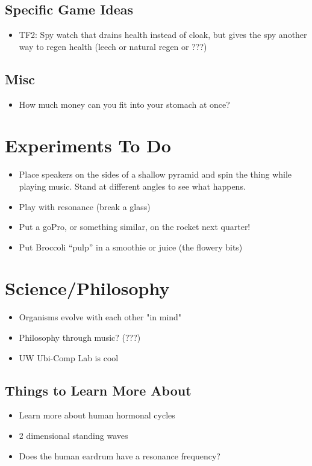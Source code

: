 \documentclass{amsart}
\begin{document}
\subsection{Specific Game Ideas}
\begin{itemize}
\item{TF2: Spy watch that drains health instead of cloak, but gives the spy another way to regen health (leech or natural regen or ???)}
\end{itemize}
\subsection{Misc}
\begin{itemize}
\item{How much money can you fit into your stomach at once?}
\end{itemize}

\section{Experiments To Do}
\begin{itemize}
\item{Place speakers on the sides of a shallow pyramid and spin the thing while playing music.  Stand at different angles to see what happens.}
\item{Play with resonance (break a glass)}
\item{Put a goPro, or something similar, on the rocket next quarter!}
\item{Put Broccoli ``pulp'' in a smoothie or juice (the flowery bits)}
\end{itemize}


\section{Science/Philosophy}
\begin{itemize}
\item{Organisms evolve with each other "in mind"}
\item{Philosophy through music? (???)}
\item{UW Ubi-Comp Lab is cool}
\end{itemize}
\subsection{Things to Learn More About}
\begin{itemize}
\item{Learn more about human hormonal cycles}
\item{2 dimensional standing waves}
\item{Does the human eardrum have a resonance frequency?}
\end{itemize}
\end{document}
